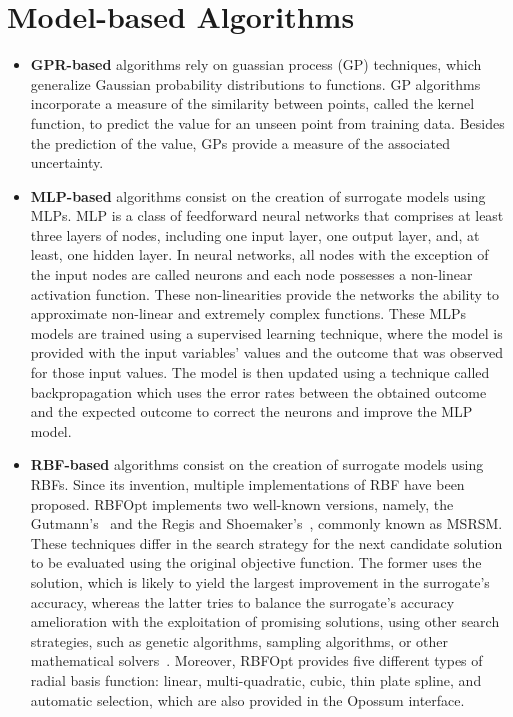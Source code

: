 \section{Model-based Algorithms}
\begin{itemize}
	\item \textbf{GPR-based} algorithms rely on guassian process (GP) techniques, which generalize Gaussian probability distributions to functions. GP algorithms incorporate a measure of the similarity between points, called the kernel function, to predict the value for an unseen point from training data. Besides the prediction of the value, GPs provide a measure of the associated uncertainty.
	
	\item \textbf{MLP-based} algorithms consist on the creation of surrogate models using \acp{MLP}. \ac{MLP} is a class of feedforward neural networks that comprises at least three layers of nodes, including one input layer, one output layer, and, at least, one hidden layer. In neural networks, all nodes with the exception of the input nodes are called neurons and each node possesses a non-linear activation function. These non-linearities provide the networks the ability to approximate non-linear and extremely complex functions. These \acp{MLP} models are trained using a supervised learning technique, where the model is provided with the input variables' values and the outcome that was observed for those input values. The model is then updated using a technique called backpropagation which uses the error rates between the obtained outcome and the expected outcome to correct the neurons and improve the \ac{MLP} model. 
	
	\item \textbf{RBF-based} algorithms consist on the creation of surrogate models using \acp{RBF}. Since its invention, multiple implementations of \ac{RBF} have been proposed. RBFOpt implements two well-known versions, namely, the Gutmann's~\cite{Gutmann2001} and the Regis and Shoemaker's~\cite{Regis2007}, commonly known as MSRSM. These techniques differ in the search strategy for the next candidate solution to be evaluated using the original objective function. The former uses the solution, which is likely to yield the largest improvement in the surrogate's accuracy, whereas the latter tries to balance the surrogate's accuracy amelioration with the exploitation of promising solutions, using other search strategies, such as genetic algorithms, sampling algorithms, or other mathematical solvers~\cite{Wortmann2017Opossum}. Moreover, RBFOpt provides five different types of radial basis function: linear, multi-quadratic, cubic, thin plate spline, and automatic selection, which are also provided in the Opossum interface.
		

\end{itemize}
